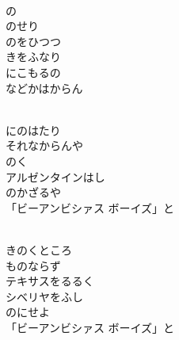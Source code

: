 \documentclass[10pt,b5j]{tarticle} %
\begin{document}
\begin{enumerate}
\begin{minipage}[c]{\blocksize}
        \vspace{\linespace}
        \item~\\
        の\\
        のせり\\
        のをひつつ\\
        きをふなり\\
        にこもるの\\
        などかはからん
        
    \end{minipage}
    \begin{minipage}[c]{\blocksize}
        
        \vspace{\linespace}
        \item~\\
        にのはたり\\
        それなからんや\\
        のく\\
        アルゼンタインはし\\
        のかざるや\\
        「ビーアンビシァス
        ボーイズ」と
        
        \vspace{\linespace}
        \item~\\
        きのくところ\\
        ものならず\\
        テキサスをるるく\\
        シベリヤをふし\\
        のにせよ\\
        「ビーアンビシァス
        ボーイズ」と
    
    \end{minipage}
\end{enumerate} %
\end{document}
